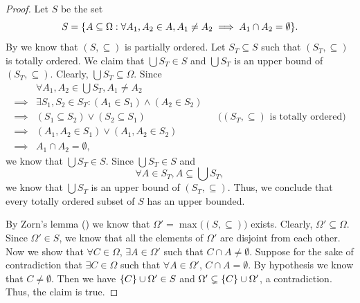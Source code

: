 \begin{proof}
  Let \(S\) be the set
  \[
    S = \set{A \subseteq \Omega : \forall A_1, A_2 \in A, A_1 \neq A_2 \implies A_1 \cap A_2 = \emptyset}.
  \]
  By  we know that \((S, \subseteq)\) is partially ordered.
  Let \(S_T \subseteq S\) such that \((S_T, \subseteq)\) is totally ordered.
  We claim that \(\bigcup S_T \in S\) and \(\bigcup S_T\) is an upper bound of \((S_T, \subseteq)\).
  Clearly, \(\bigcup S_T \subseteq \Omega\).
  Since
  \begin{align*}
             & \forall A_1, A_2 \in \bigcup S_T, A_1 \neq A_2                                                                     \\
    \implies & \exists S_1, S_2 \in S_T : (A_1 \in S_1) \land (A_2 \in S_2)                                                       \\
    \implies & (S_1 \subseteq S_2) \lor (S_2 \subseteq S_1)                 &  & \text{(\((S_T, \subseteq)\) is totally ordered)} \\
    \implies & (A_1, A_2 \in S_1) \lor (A_1, A_2 \in S_2)                                                                         \\
    \implies & A_1 \cap A_2 = \emptyset,
  \end{align*}
  we know that \(\bigcup S_T \in S\).
  Since \(\bigcup S_T \in S\) and
  \[
    \forall A \in S_T, A \subseteq \bigcup S_T,
  \]
  we know that \(\bigcup S_T\) is an upper bound of \((S_T, \subseteq)\).
  Thus, we conclude that every totally ordered subset of \(S\) has an upper bounded.

  By Zorn's lemma () we know that \(\Omega' = \max\big((S, \subseteq)\big)\) exists.
  Clearly, \(\Omega' \subseteq \Omega\).
  Since \(\Omega' \in S\), we know that all the elements of \(\Omega'\) are disjoint from each other.
  Now we show that \(\forall C \in \Omega\), \(\exists A \in \Omega'\) such that \(C \cap A \neq \emptyset\).
  Suppose for the sake of contradiction that \(\exists C \in \Omega\) such that \(\forall A \in \Omega'\), \(C \cap A = \emptyset\).
  By hypothesis we know that \(C \neq \emptyset\).
  Then we have \(\left\lbrace C\right\rbrace \cup \Omega' \in S\) and \(\Omega' \subsetneq \left\lbrace C\right\rbrace \cup \Omega'\), a contradiction.
  Thus, the claim is true.


\end{proof}
